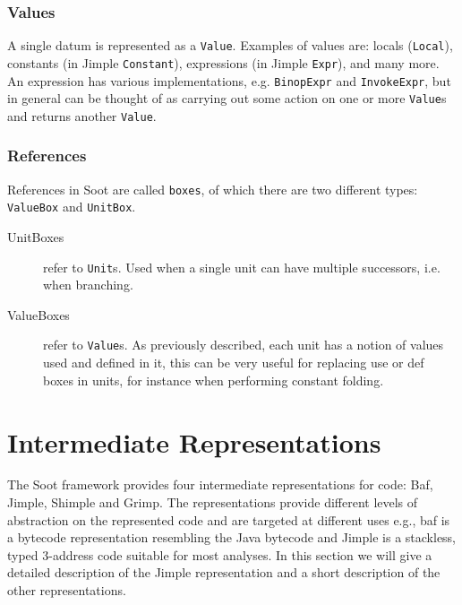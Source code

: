 \documentclass{article}
\newcommand{\code}[1]{\texttt{\small #1}}
\begin{document}
\subsubsection*{Values}

A single datum is represented as a \code{Value}. Examples of values
are: locals (\code{Local}), constants (in Jimple \code{Constant}),
expressions (in Jimple \code{Expr}), and many more. An expression has
various implementations, e.g. \code{BinopExpr} and \code{InvokeExpr},
but in general can be thought of as carrying out some action on one or
more \code{Value}s and returns another \code{Value}.

\subsubsection*{References}

References in Soot are called \code{boxes}, of which there
are two different types: \code{ValueBox} and \code{UnitBox}.
\begin{description}
\item[UnitBoxes] refer to \code{Unit}s. Used when a single unit can
  have multiple successors, i.e. when branching.
\item[ValueBoxes] refer to \code{Value}s. As previously described,
  each unit has a notion of values used and defined in it, this can be
  very useful for replacing use or def boxes in units, for instance when
  performing constant folding.
\end{description}


\section{Intermediate Representations}


The Soot framework provides four intermediate representations for
code: Baf, Jimple, Shimple and Grimp. The representations provide
different levels of abstraction on the represented code and are
targeted at different uses e.g., baf is a bytecode representation
resembling the Java bytecode and Jimple is a stackless, typed
3-address code suitable for most analyses. In this section we will
give a detailed description of the Jimple representation and a short
description of the other representations.
\end{document}
